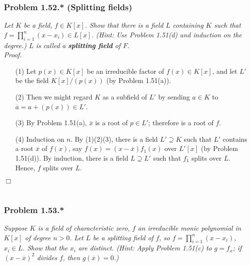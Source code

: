 \documentclass{article}
\begin{document}
\subsubsection*{Problem 1.52.* (Splitting fields)}
\emph{Let $K$ be a field, $f \in K[x]$.
Show that there is a field $L$ containing $K$ such that
$f = \prod_{i=1}^{n} (x - x_i) \in L[x]$.
(Hint: Use Problem 1.51(d) and induction on the degree.)
$L$ is called a \textbf{splitting field} of $F$.} \\

\emph{Proof.}
\begin{enumerate}
\item[(1)]
  Let $p(x) \in K[x]$ be an irreducible factor of $f(x) \in K[x]$,
  and let $L'$ be the field $K[x]/(p(x))$ (by Problem 1.51(a)).

\item[(2)]
  Then we might regard $K$ as a subfield of $L'$
  by sending $a \in K$ to $\overline{a} = a + (p(x)) \in L'$.

\item[(3)]
  By Problem 1.51(a), $\overline{x}$ is a root of $p \in L'$;
  therefore is a root of $f$.

\item[(4)]
  Induction on $n$. By (1)(2)(3), there is a field $L' \supseteq K$
  such that $L'$ contains a root $\overline{x}$ of $f(x)$,
  say $f(x) = (x - \overline{x}) f_1(x)$ over $L'[x]$ (by Problem 1.51(d)).
  By induction, there is a field $L \supseteq L'$ such that
  $f_1$ splits over $L$.
  Hence, $f$ splits over $L$.
\end{enumerate}
$\Box$ \\\\






\subsubsection*{Problem 1.53.*}
\emph{Suppose $K$ is a field of characteristic zero,
$f$ an irreducible monic polynomial in $K[x]$ of degree $n > 0$.
Let $L$ be a splitting field of $f$,
so $f = \prod_{i=1}^{n} (x - x_i)$, $x_i \in L$.
Show that the $x_i$ are distinct.
(Hint: Apply Problem 1.51(c) to $g = f_x$;
if $(x - \overline{x})^2$ divides $f$, then $g(\overline{x}) = 0$.)} \\
\end{document}
